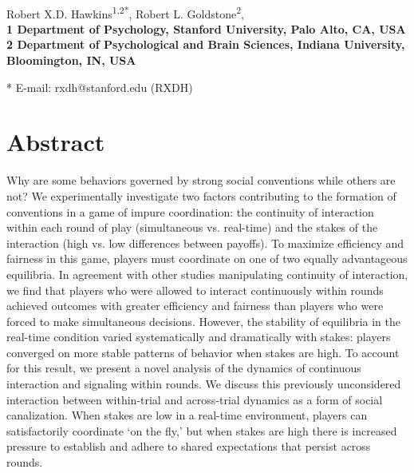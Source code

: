 \documentclass[10pt,letterpaper]{article}
\date{}
\begin{document}
\vspace*{0.35in}

\begin{flushleft}
{\Large
\textbf{}
}
\newline
\\
Robert X.D. Hawkins\textsuperscript{1,2*},
Robert L. Goldstone\textsuperscript{2},
\\
\bigskip
\bf{1} Department of Psychology, Stanford University, Palo Alto, CA, USA
\\
\bf{2} Department of Psychological and Brain Sciences, Indiana University, Bloomington, IN, USA
\\
\bigskip

% 
%


* E-mail: rxdh@stanford.edu (RXDH)

\end{flushleft}
\section*{Abstract}
Why are some behaviors governed by strong social conventions while others are not? We experimentally investigate two factors contributing to the formation of conventions in a game of impure coordination: the continuity of interaction within each round of play (simultaneous vs. real-time) and the stakes of the interaction (high vs. low differences between payoffs). To maximize efficiency and fairness in this game, players must coordinate on one of two equally advantageous equilibria. In agreement with other studies manipulating continuity of interaction, we find that players who were allowed to interact continuously within rounds achieved outcomes with greater efficiency and fairness than players who were forced to make simultaneous decisions. However, the stability of equilibria in the real-time condition varied systematically and dramatically with stakes: players converged on more stable patterns of behavior when stakes are high. To account for this result, we present a novel analysis of the dynamics of continuous interaction and signaling within rounds. We discuss this previously unconsidered interaction between within-trial and across-trial dynamics as a form of social canalization. When stakes are low in a real-time environment, players can satisfactorily coordinate `on the fly,' but when stakes are high there is increased pressure to establish and adhere to shared expectations that persist across rounds.
\end{document}
